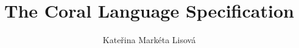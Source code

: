 \documentclass[12pt,a4paper,twoside,titlepage]{book}
\begin{document}
\frontmatter
\title{The Coral Language Specification}
\renewcommand{\docversion}{1.0}
\author{Kateřina Markéta Lisová}
\maketitle
\clearemptydoublepage
\tableofcontents

\mainmatter
\sloppy



\appendix

\end{document}
